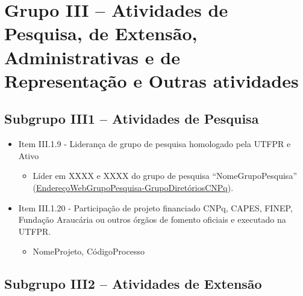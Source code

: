 \section{Grupo III -- Atividades de Pesquisa, de Extensão, Administrativas e de Representação e Outras atividades}


\subsection{Subgrupo III1 -- Atividades de Pesquisa}

\begin{itemize}
    \item Item III.1.9 - Liderança de grupo de pesquisa homologado pela UTFPR e Ativo
    \begin{itemize}     
        \item Líder em XXXX e XXXX do grupo de pesquisa ``NomeGrupoPesquisa'' (\url{EndereçoWebGrupoPesquisa-GrupoDiretóriosCNPq}).
    \end{itemize}
    
    \item Item III.1.20 - Participação de projeto financiado CNPq, CAPES, FINEP, Fundação Araucária ou outros órgãos de fomento oficiais e executado na UTFPR.
    \begin{itemize}
        \item NomeProjeto, CódigoProcesso
    \end{itemize}
\end{itemize}


\subsection{Subgrupo III2 -- Atividades de Extensão}

